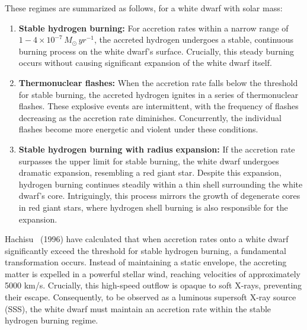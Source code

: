         	These regimes are summarized as follows, for a white dwarf with solar mass:        	
        	\begin{enumerate}
				\item \textbf{Stable hydrogen burning:} For accretion rates within a narrow range of $1-4\times 10^{-7}\,M_{\odot}\,yr^{-1}$, the accreted hydrogen undergoes a stable, continuous burning process on the white dwarf's surface. Crucially, this steady burning occurs without causing significant expansion of the white dwarf itself.
				\item \textbf{Thermonuclear flashes:} When the accretion rate falls below the threshold for stable burning, the accreted hydrogen ignites in a series of thermonuclear flashes. These explosive events are intermittent, with the frequency of flashes decreasing as the accretion rate diminishes. Concurrently, the individual flashes become more energetic and violent under these conditions.
				\item \textbf{Stable hydrogen burning with radius expansion:} If the accretion rate surpasses the upper limit for stable burning, the white dwarf undergoes dramatic expansion, resembling a red giant star. Despite this expansion, hydrogen burning continues steadily within a thin shell surrounding the white dwarf's core. Intriguingly, this process mirrors the growth of degenerate cores in red giant stars, where hydrogen shell burning is also responsible for the expansion.
			\end{enumerate}
			
			Hachisu \etal\ (1996) \cite{hachisu96} have calculated that when accretion rates onto a white dwarf significantly exceed the threshold for stable hydrogen burning, a fundamental transformation occurs. Instead of maintaining a static envelope, the accreting matter is expelled in a powerful stellar wind, reaching velocities of approximately 5000 km/s. Crucially, this high-speed outflow is opaque to soft X-rays, preventing their escape. Consequently, to be observed as a luminous supersoft X-ray source (SSS), the white dwarf must maintain an accretion rate within the stable hydrogen burning regime.
			
